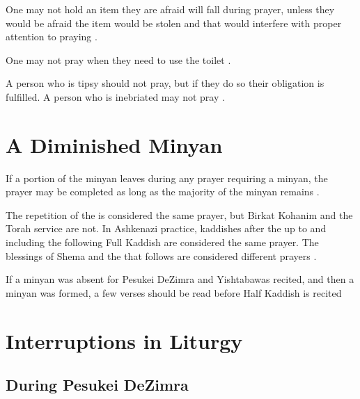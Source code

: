 One may not hold an item they are afraid will fall during prayer, unless they would be afraid the item would be stolen and that would interfere with proper attention to praying \parencite[5:7 citing OC 96]{PH}.

One may not pray when they need to use the toilet \parencite*[5:8 citing Berakhot 15a]{PH}.

A person who is tipsy should not pray, but if they do so their obligation is fulfilled.  A person who is inebriated may not pray \parencite*[5:11 citing OC 99]{PH}.

\section{A Diminished Minyan}

If a portion of the minyan leaves during any prayer requiring a minyan, the prayer may be completed as long as the majority of the minyan remains  \parencite*[2:10 citing OC 55]{PH}.

The repetition of the \amidah is considered the same prayer, but Birkat Kohanim and the Torah service are not. In Ashkenazi practice, kaddishes after the \amidah up to and including the following Full Kaddish are considered the same prayer. The blessings of Shema and the \amidah that follows are considered different prayers \parencite*{PH}.

If a minyan was absent for Pesukei DeZimra and Yishtaba\heth\space was recited, and then a minyan was formed, a few verses should be read before Half Kaddish is recited \parencite*[15:1]{Kitzur}

\section{Interruptions in Liturgy}

\subsection{During Pesukei DeZimra}

